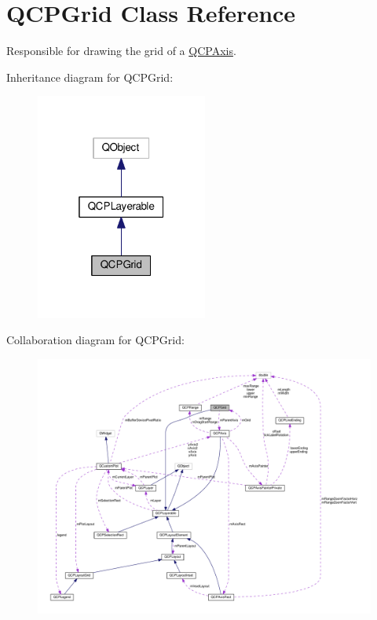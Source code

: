 \hypertarget{classQCPGrid}{}\section{Q\+C\+P\+Grid Class Reference}
\label{classQCPGrid}


Responsible for drawing the grid of a \hyperlink{classQCPAxis}{Q\+C\+P\+Axis}.  




Inheritance diagram for Q\+C\+P\+Grid\+:
\nopagebreak
\begin{figure}[H]
\begin{center}
\leavevmode
\includegraphics[width=160pt]{classQCPGrid__inherit__graph}
\end{center}
\end{figure}


Collaboration diagram for Q\+C\+P\+Grid\+:
\nopagebreak
\begin{figure}[H]
\begin{center}
\leavevmode
\includegraphics[width=350pt]{classQCPGrid__coll__graph}
\end{center}
\end{figure}
